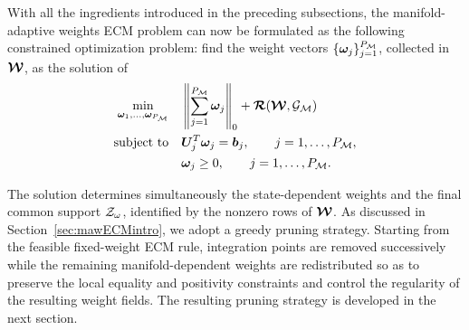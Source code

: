 \documentclass[preprint,10pt]{elsarticle}  %
\newcommand{\PROMPT}[1]{ }
\begin{document}
%  


With all the ingredients introduced in the preceding subsections, the
manifold-adaptive weights ECM problem can now be formulated as the following
constrained optimization problem: find the  weight vectors
\(\{\bm{\omega}_{j}\}_{j=1}^{P_{\mathcal{M}}}\), collected in \(\boldsymbol{\mathcal{W}}\), as the solution
of
\begin{equation}
\begin{aligned}
\min_{\bm{\omega}_{1},\ldots,\bm{\omega}_{P_{\mathcal{M}}}}
\quad &
\left\|
\sum_{j=1}^{P_{\mathcal{M}}}
\bm{\omega}_{j}
\right\|_0
+
 \boldsymbol{\mathcal{R}}(\boldsymbol{\mathcal{W}},\mathcal{G}_{\mathcal{M}})
\\
\text{subject to}
\quad &
\bm{U}_{j}^{T}\bm{\omega}_{j}
=
\bm{b}_{j},
\qquad
j=1,\ldots,P_{\mathcal{M}},
\\
&
\bm{\omega}_{j}\ge0,
\qquad
j=1,\ldots,P_{\mathcal{M}} .
\end{aligned}
\label{eq:MAW_global_l0}
\end{equation}

The solution determines simultaneously the state-dependent weights and
the final common support \(\mathcal{Z}_{\omega}\), identified by the nonzero rows of
\(\boldsymbol{\mathcal{W}}\).  As discussed in
Section~\ref{sec:mawECMintro}, we   adopt a greedy pruning strategy. Starting from the feasible
fixed-weight ECM rule, integration points are removed successively while
the remaining manifold-dependent weights are redistributed so as to
preserve the local equality and positivity constraints and control the
regularity of the resulting weight fields. The resulting pruning
strategy is developed in the next section.



%


%
%
%
\end{document}
